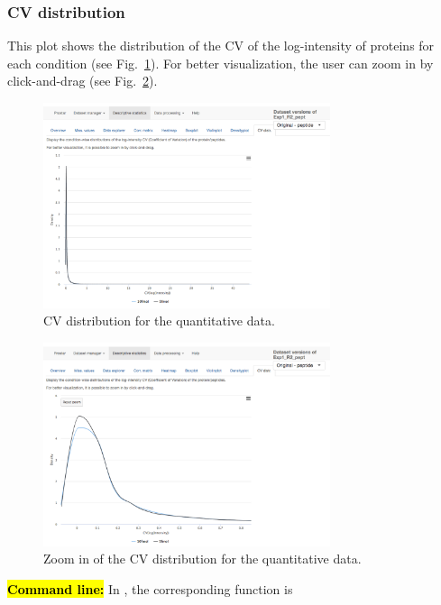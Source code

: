 \documentclass[12pt]{article}
\begin{document}
{%

\subsubsection{CV distribution}
This plot shows the distribution of the CV of the log-intensity of 
proteins for each condition (see Fig.~\ref{fig:sdvdZoomOut}). For better visualization, 
the user can zoom in by click-and-drag (see Fig.~\ref{fig:sdvdZoomIn}).


\begin {figure}
\centering
\includegraphics[width=0.75\textwidth]{images/desc_CVDist_zoomOut.png}
\caption{CV distribution for the quantitative data.}\label{fig:sdvdZoomOut}
\end {figure}

\begin {figure}
\centering
\includegraphics[width=0.75\textwidth]{images/desc_CVDist_ZoomIn.png}
\caption{Zoom in of the CV distribution for the quantitative data.}\label{fig:sdvdZoomIn}
\end {figure}


\hl{\bf Command line:} In , the corresponding function is 

}
\end{document}
